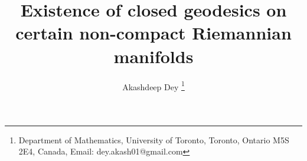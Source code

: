 \documentclass[11pt,twoside]{article}
\begin{document}
\title{\textbf{Existence of closed geodesics on certain non-compact Riemannian manifolds}}
\author{Akashdeep Dey \thanks{Department of Mathematics, University of Toronto, Toronto, Ontario M5S 2E4, Canada, Email:  dey.akash01@gmail.com}}
\date{}
\maketitle

\theoremstyle{plain}
\newtheorem{thm}{Theorem}[section]
\newtheorem{lem}[thm]{Lemma}
\newtheorem{pro}[thm]{Proposition}
\newtheorem{clm}[thm]{Claim}
\newtheorem{cor}[thm]{Corollary}
\newtheorem*{thm*}{Theorem}
\newtheorem*{lem*}{Lemma}
\newtheorem*{clm*}{Claim}

\theoremstyle{definition}
\newtheorem{defn}[thm]{Definition}
\newtheorem{ex}[thm]{Example}
\newtheorem{rmk}[thm]{Remark}


\newcommand{\mf}{manifold\;}\newcommand{\mfs}{manifolds\;}
\newcommand{\vf}{varifold\;}
\newcommand{\hy}{hypersurface\;}
\newcommand{\Rm}{Riemannian\;}
\newcommand{\cn}{constant\;}
\newcommand{\mt}{metric\;} 
\newcommand{\st}{such that\;}\newcommand{\sot}{so that\;}
\newcommand{\Thm}{Theorem\;}
\newcommand{\Lem}{Lemma\;}
\newcommand{\Pro}{Proposition\;}
\newcommand{\eqn}{equation\;}
\newcommand{\te}{there exist\;}\newcommand{\tes}{there exists\;}\newcommand{\Te}{There exist\;}\newcommand{\Tes}{There exists\;}\newcommand{\fa}{for all\;}
\newcommand{\tf}{Therefore,\;} \newcommand{\hn}{Hence,\;}\newcommand{\Sn}{Since\;}\newcommand{\sn}{since\;}\newcommand{\nx}{\Next,\;}\newcommand{\df}{define\;}
\newcommand{\wrt}{with respect to\;}
\newcommand{\bbr}{\mathbb{R}}\newcommand{\bbq}{\mathbb{Q}}
\newcommand{\bbn}{\mathbb{N}}
\newcommand{\bbz}{\mathbb{Z}}
\newcommand{\mres}{\scalebox{1.8}{$\llcorner$}}
\newcommand{\ra}{\rightarrow}
\newcommand{\fn}{function\;}
\newcommand{\lra}{\longrightarrow}
\newcommand{\sps}{Suppose\;}
\newcommand{\del}{\partial}
\newcommand{\seq}{sequence\;}\newcommand{\w}{with\;}
\newcommand{\cts}{continuous\;} 
\newcommand{\bX}{\mathbf{X}} 
\newcommand{\bA}{\mathbf{A}} 
\newcommand{\bfe}{\mathbf{e}}\newcommand{\bc}{\mathbf{c}}\newcommand{\bj}{\mathbf{j}}
\newcommand{\bL}{\mathbf{L}}\newcommand{\bH}{\mathbf{H}}
\newcommand{\cm}{\mathcal{C}(M)}
\newcommand{\zn}{\mathcal{Z}_n(M, \mathbb{Z}_2)}
\newcommand{\Le}{\sL^E}\newcommand{\msu}{M \setminus U}

\newcommand{\cA}{\mathcal{A}}\newcommand{\cB}{\mathcal{B}}\newcommand{\cC}{\mathcal{C}}\newcommand{\cD}{\mathcal{D}}\newcommand{\cE}{\mathcal{E}}\newcommand{\cF}{\mathcal{F}}\newcommand{\cG}{\mathcal{G}}\newcommand{\cH}{\mathcal{H}}\newcommand{\cI}{\mathcal{I}}\newcommand{\cJ}{\mathcal{J}}\newcommand{\cK}{\mathcal{K}}\newcommand{\cL}{\mathcal{L}}\newcommand{\cM}{\mathcal{M}}\newcommand{\cN}{\mathcal{N}}\newcommand{\cO}{\mathcal{O}}\newcommand{\cP}{\mathcal{P}}\newcommand{\cQ}{\mathcal{Q}}\newcommand{\cR}{\mathcal{R}}\newcommand{\cS}{\mathcal{S}}\newcommand{\cT}{\mathcal{T}}\newcommand{\cU}{\mathcal{U}}\newcommand{\cV}{\mathcal{V}}\newcommand{\cW}{\mathcal{W}}\newcommand{\cX}{\mathcal{X}}\newcommand{\cY}{\mathcal{Y}}\newcommand{\cZ}{\mathcal{Z}}
\end{document}
